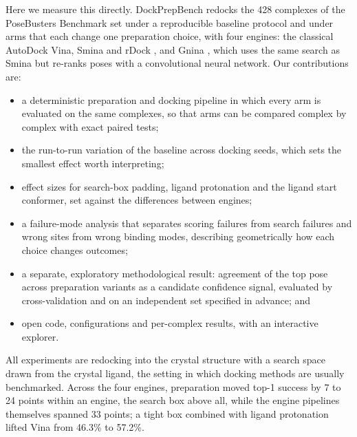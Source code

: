Here we measure this directly. DockPrepBench redocks the 428 complexes of the PoseBusters
Benchmark set under a reproducible baseline protocol and under arms that each change one
preparation choice, with four engines: the classical AutoDock Vina, Smina
\citep{koes2013smina} and rDock \citep{ruizcarmona2014rdock}, and Gnina
\citep{mcnutt2021gnina}, which uses the same search as Smina but re-ranks poses with a
convolutional neural network. Our contributions are:
\begin{itemize}
  \item a deterministic preparation and docking pipeline in which every arm is evaluated on
    the same complexes, so that arms can be compared complex by complex with exact paired
    tests;
  \item the run-to-run variation of the baseline across docking seeds, which sets the
    smallest effect worth interpreting;
  \item effect sizes for search-box padding, ligand protonation and the ligand start
    conformer, set against the differences between engines;
  \item a failure-mode analysis that separates scoring failures from search failures and
    wrong sites from wrong binding modes, describing geometrically how each choice changes
    outcomes;
  \item a separate, exploratory methodological result: agreement of the top pose across
    preparation variants as a candidate confidence signal, evaluated by cross-validation
    and on an independent set specified in advance; and
  \item open code, configurations and per-complex results, with an interactive explorer.
\end{itemize}
All experiments are redocking into the crystal structure with a search space drawn from the
crystal ligand, the setting in which docking methods are usually benchmarked. Across the four
engines, preparation moved top-1 success by 7 to 24 points within an engine, the search box
above all, while the engine pipelines themselves spanned 33 points; a tight box combined with
ligand protonation lifted Vina from 46.3\% to 57.2\%.
